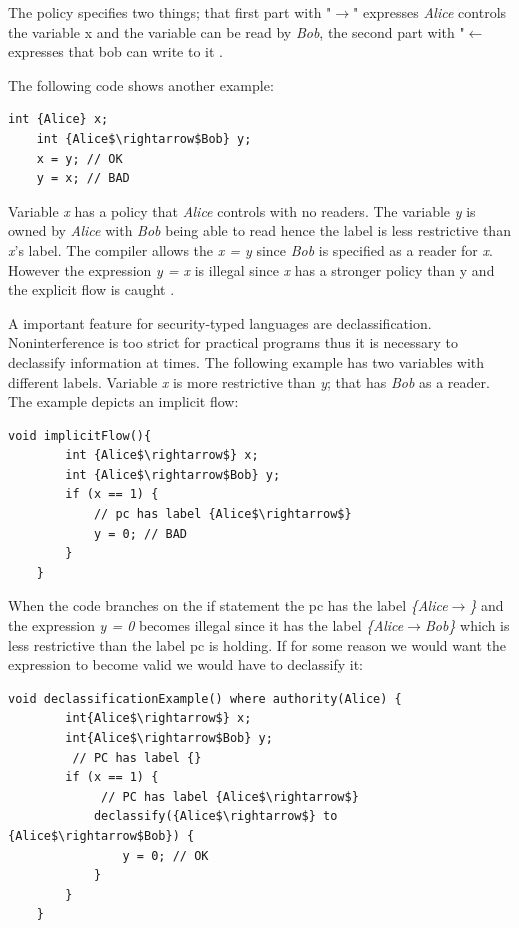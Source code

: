 The policy specifies two things; that first part with "$\rightarrow$" expresses \emph{Alice} controls the variable x and the variable can be read by \emph{Bob}, the second part with "$\leftarrow$ expresses that bob can write to it \cite{jifmanual}. 

The following code shows another example:

\begin{lstlisting}[mathescape]
	int {Alice} x;
	int {Alice$\rightarrow$Bob} y;
	x = y; // OK
	y = x; // BAD
\end{lstlisting}


Variable  \emph{x} has a policy that \emph{Alice} controls with no readers. The variable \emph{y} is owned by \emph{Alice} with \emph{Bob} being able to read hence the label is less restrictive than \emph{x}'s label. The compiler allows the \emph{x = y} since \emph{Bob} is specified as a reader for \emph{x}. However the expression \emph{y = x} is illegal since \emph{x} has a stronger policy than y and the explicit flow is caught \cite{jifmanual}.


A important feature for security-typed languages are declassification. Noninterference is too strict for practical programs thus it is necessary to declassify information at times. The following example has two variables with different labels. Variable \emph{x} is more restrictive than \emph{y}; that has \emph{Bob} as a reader. The example depicts an implicit flow: 

\begin{lstlisting}[mathescape]
	void implicitFlow(){
		int {Alice$\rightarrow$} x;
		int {Alice$\rightarrow$Bob} y;
		if (x == 1) { 
			// pc has label {Alice$\rightarrow$}
			y = 0; // BAD
		}
	}
\end{lstlisting}

When the code branches on the if statement the pc has the label \emph{\{Alice$\rightarrow$\}} and the expression \emph{y = 0} becomes illegal since it has the label \emph{\{Alice$\rightarrow$Bob\}} which is less restrictive than the label pc is holding. If for some reason we would want the expression to become valid we would have to declassify it:

\begin{lstlisting}[mathescape]
	void declassificationExample() where authority(Alice) {
		int{Alice$\rightarrow$} x;
		int{Alice$\rightarrow$Bob} y;
		 // PC has label {}
		if (x == 1) {
			 // PC has label {Alice$\rightarrow$}
			declassify({Alice$\rightarrow$} to {Alice$\rightarrow$Bob}) {
				y = 0; // OK
			}
		}
	}
\end{lstlisting}

